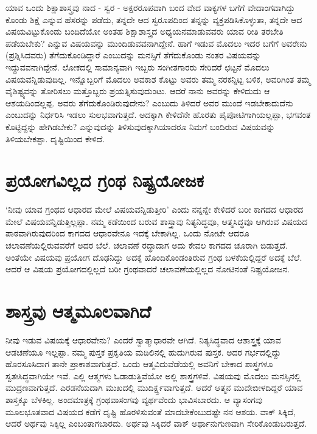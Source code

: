ಯಾವ  ಒಂದು ಶಿಕ್ಷಾಶಾಸ್ತ್ರವು ನಾದ - ಸ್ವರ - ಅಕ್ಷರರೂಪವಾಗಿ ಬಂದ ವೇದ ವಾಕ್ಯಗಳ ಬಗೆಗೆ ವೇದಾಂಗವಾಗಿದ್ದು ಕೊಂಡು ಶಿಕ್ಷೆ  ಎನ್ನುವ ಹೆಸರನ್ನು  ಪಡೆದು, ತನ್ನದೇ ಆದ ಸ್ವರೂಪದಿಂದ ತನ್ನನ್ನು ವ್ಯಕ್ತಪಡಿಸಿಕೊಳ್ಳುತಾ, ತನ್ನದೇ ಆದ ವಿಷಯವಿಟ್ಟುಕೊಂಡು ಬಂದಿದೆಯೋ ಅಂತಹ ಶಿಕ್ಷಾಶಾಸ್ತ್ರದ ಅಧ್ಯಯನಮಾಡುವವರು ಯಾವ ರೀತಿ ತರಬೇತಿ ಪಡೆಯಬೇಕು?  ಎನ್ನುವ ವಿಷಯವನ್ನು ಮುಂದಿಡುವವನಾಗಿದ್ದೇನೆ. ಹಾಗೆ ಇಡುವ ಮೊದಲು ಇದರ ಬಗೆಗೆ ಅವರೇನು (ಪ್ರಶ್ನಿಸಿದವರು) ತೆಗೆದುಕೊಂಡಿದ್ದಾರೆ ಎಂಬುದನ್ನು  ಮನಸ್ಸಿಗೆ ತೆಗೆದುಕೊಂಡು ನಂತರ ವಿಷಯವನ್ನು ಇದ್ದುವವನಾಗಿದ್ದೇನೆ. ಲೋಕದಲ್ಲಿ  ಸಾಮಾನ್ಯವಾಗಿ ಇಬ್ಬರು ಸಂಗೀತಗಾರರು ಸೇರಿದರೆ ಛಟ್ಟನೆ ಮೊದಲು ವಿಷಯವನ್ನಿಡುವುದಿಲ್ಲ. ಇನ್ನೊಬ್ಬರಿಗೆ ಮೊದಲು ಅವಕಾಶ ಕೊಟ್ಟು ಅವರು ತಮ್ಮ ನರಕನ್ನಿಟ್ಟ ಬಳಿಕ, ಅವರಿಗಿಂತ ತಮ್ಮ ವೈಶಿಷ್ಟ್ಯವನ್ನು  ತೋರಿಸಲು ಮತ್ತೊಬ್ಬರು ಪ್ರಯತ್ನಿಸುವುದುಂಟು. ಆದರೆ ನಾನು ಅವರನ್ನು  ಕೇಳಿದುದು ಆ ಆಶಯದಿಂದಲ್ಲಪ್ಪ. ಅವರು ತೆಗೆದುಕೊಂಡಿರುವುದೇನು? ಎಂಬುದು ತಿಳಿದರೆ ಅವರ ಮುಂದೆ ಇಡಬೇಕಾದುದೆನು ಎಂಬುದನ್ನು ನಿರ್ಧರಿಸಿ ಇಡಲು ಸುಲಭವಾಗುತ್ತದೆ. ಅದಕ್ಕಾಗಿ ಕೇಳಿದೆನೇ ಹೊರತು ಪೈಪೋಟಿಗಾಗಿಯಲ್ಲಪ್ಪಾ, ಭಗವಂತ ಕೊಟ್ಟಿದ್ದನ್ನು  ಹೇಗಿಡಬೇಕು? ಎನ್ನುವುದನ್ನು  ತಿಳಿಸುವುದಕ್ಕಾಗಿಯಾದರೂ ನಿಮಗೆ ಬಂದಿರುವ ವಿಷಯವನ್ನು  ತಿಳಿಯಬೇಕಪ್ಪಾ. ದೃಷ್ಟಿಯಿಂದ ಕೇಳಿದೆ.

\section*{ಪ್ರಯೋಗವಿಲ್ಲದ ಗ್ರಂಥ ನಿಷ್ಪ್ರಯೋಜಕ}

`ನೀವು  ಯಾವ ಗ್ರಂಥದ ಆಧಾರದ ಮೇಲೆ ವಿಷಯವನ್ನಿಡುತ್ತೀರಿ' ಎಂದು ನನ್ನನ್ನೇ ಕೇಳಿದರೆ ಬರೀ ಕಾಗದದ ಆಧಾರದ ಮೇಲೆ ವಿಷಯವನ್ನಿಡುತ್ತಿಲ್ಲಪ್ಪಾ. ನಮ್ಮ  ಕಡೆಯಿಂದ ಬರುವ ಶಾಸ್ತ್ರಾವು  ನಿತ್ಯನಿದ್ಧವೂ, ಆತ್ಮಸಿದ್ಧವೂ ಆಗಿರುವ ವಿಷಯದ ಪಾಠವಾಗಿರುವುದರಿಂದ ಕಾಗದದ ಆಧಾರವೇನೂ ಇದಕ್ಕೆ  ಬೇಕಾಗಿಲ್ಲ. ಒಂದು ನೋಟೇ ಆದರೂ ಚಲಾವಣೆಯಲ್ಲಿರುವವರೆಗೆ ಅದರ ಬೆಲೆ. ಚಲಾವಣೆ ರದ್ಧಾದಾಗ ಅದು ಕೇವಲ ಕಾಗದದ ಚೂರಾಗಿ ಬಿಡುತ್ತದೆ. ಅಂತೆಯೇ ವಿಷಯವು  ಪ್ರಯೋಗ ದೊಢನಿದ್ದು  ಅದಕ್ಕೆ  ಹೊಂದಿಕೊಂಡಂತಿರುವ ಗ್ರಂಥ  ಬಳಕೆಯಲ್ಲಿದ್ದರೆ ಅದಕ್ಕೆ  ಬೆಲೆ.  ಆದರೆ ಆ ವಿಷಯ ಪ್ರಯೋಗದಲ್ಲಿಲ್ಲದೆ ಬರೀ ಗ್ರಂಥವಾದರೆ  ಚಲಾವಣೆಯಲ್ಲಿಲ್ಲದ ನೋಟಿನಂತೆ  ನಿಷ್ಪ್ರಯೋಜನ.

\section*{ಶಾಸ್ತ್ರವು  ಆತ್ಮಮೂಲವಾಗಿದೆ}

ನೀವು  ಇಡುವ ವಿಷಯಕ್ಕೆ  ಆಧಾರವೇನು? ಎಂದರೆ  ಸ್ವಾತ್ಮಾಧಾರವೇ ಆಗಿದೆ.  ನಿತ್ಯಸಿದ್ಧವಾದ ಆಶಾಸ್ತ್ರಕ್ಕೆ  ಯಾವ  ಆಡಚಣೆಯೂ ಇಲ್ಲಪ್ಪಾ. ನಮ್ಮ  ಪುಸ್ತಕ  ಪ್ರಕೃತಿಯ ಮಡಿಲಿನಲ್ಲಿ  ಹುದುಗಿರುವ ಪುಸ್ತಕ. ಅದರ ಗರ್ಭದಲ್ಲಿದ್ದು  ಹೊರಸೂಸಿದಾಗ ತಾನೇ  ಪ್ರಾಕಾಶವಾಗುತ್ತದೆ. ಒಂದು  ಆತ್ಮವಿದುವೆಡೆಯಲ್ಲಿ ಅವನಿಗೆ ಬೇಕಾದ ಶಾಸ್ತ್ರಗಳೂ ಸ್ವತಃಸಿದ್ಧವಾಗಿಯೇ ಇವೆ. ಎಲ್ಲಿ ಆತ್ಮಗಳು ಓಡಾಡುತ್ತಿವೆಯೋ ಅಲ್ಲಿ ಶಾಸ್ತ್ರಗಳಿವೆ. ವಿಷಯವು ಮೊದಲು ಮನಸ್ಸಿನಲ್ಲಿ  ಮುದ್ರಣವಾಗುತ್ತದೆ. ಎರಡನೆಯದಾಗಿ ಮುಖದಲ್ಲಿ  ಮುದಿರ್ಕ್ಷ್ತವಾಗುತ್ತದೆ. ಆದರೆ ಆತ್ಮನ ಮುದೇಬೀಳದಿದ್ದರೆ ಯಾವ ಶಾಸ್ತಕ್ಕೂ  ಬೆಳಕಿಲ್ಲ.  ಅಂದಮಾತ್ರಕ್ಕೆ  ಗ್ರಂಥವಾಸಂಗವು  ವ್ಯರ್ಥವೆಂದು  ಭಾವಿಸಬಾರದು. ಆ ವ್ಯಾಸಂಗವು  ಮೂಲಭೂತವಾದ ವಿಷಯದ ಕಡೆಗೆ ದೃಷ್ಟಿ ಹೊರಳಿಸುವಂತೆ  ಮಾದಬೇಕೆಂಬುದಷ್ಟೇ ನನ ಆಶಯ. ವಾಕ್ ಸಿಕ್ಕಿದೆ, ಆದರೆ ಅರ್ಥವು  ಸಿಕ್ಕಿಲ್ಲ ಎಂಬಂತಾಗಬಾರದು. ಅರ್ಥವು ಸಿಕ್ಕಿದರೆ  ವಾಕ್ ಅರ್ಥಾನುಗುಣವಾಗಿ ಸೇರಿಕೊಂಡುಬರುತ್ತದೆ. 

